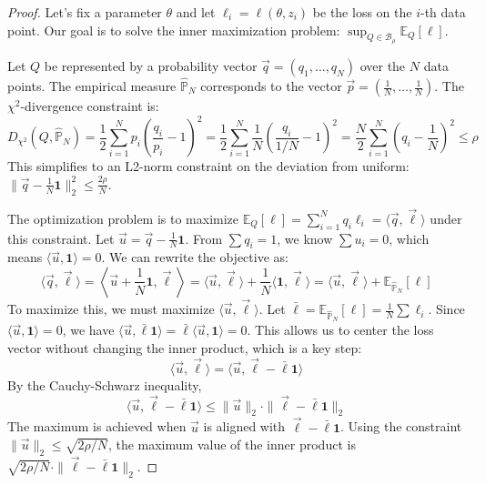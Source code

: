 \documentclass[12pt]{report}
\begin{document}
\begin{proof}
Let's fix a parameter $\theta$ and let $\ell_i = \ell(\theta, z_i)$ be the loss on the $i$-th data point. Our goal is to solve the inner maximization problem: $\sup_{Q \in \mathcal{B}_\rho} \mathbb{E}_Q[\ell]$.

Let $Q$ be represented by a probability vector $\vec{q} = (q_1, \dots, q_N)$ over the $N$ data points. The empirical measure $\hat{\mathbb{P}}_N$ corresponds to the vector $\vec{p} = (\frac{1}{N}, \dots, \frac{1}{N})$. The $\chi^2$-divergence constraint is:
\[
D_{\chi^2}(Q, \hat{\mathbb{P}}_N) = \frac{1}{2} \sum_{i=1}^N p_i \left(\frac{q_i}{p_i} - 1\right)^2 = \frac{1}{2} \sum_{i=1}^N \frac{1}{N} \left(\frac{q_i}{1/N} - 1\right)^2 = \frac{N}{2} \sum_{i=1}^N \left(q_i - \frac{1}{N}\right)^2 \le \rho
\]
This simplifies to an L2-norm constraint on the deviation from uniform: $\|\vec{q} - \frac{1}{N}\mathbf{1}\|_2^2 \le \frac{2\rho}{N}$.

The optimization problem is to maximize $\mathbb{E}_Q[\ell] = \sum_{i=1}^N q_i \ell_i = \langle \vec{q}, \vec{\ell} \rangle$ under this constraint. Let $\vec{u} = \vec{q} - \frac{1}{N}\mathbf{1}$. From $\sum q_i = 1$, we know $\sum u_i = 0$, which means $\langle \vec{u}, \mathbf{1} \rangle = 0$. We can rewrite the objective as:
\[
\langle \vec{q}, \vec{\ell} \rangle = \left\langle \vec{u} + \frac{1}{N}\mathbf{1}, \vec{\ell} \right\rangle = \langle \vec{u}, \vec{\ell} \rangle + \frac{1}{N} \langle \mathbf{1}, \vec{\ell} \rangle = \langle \vec{u}, \vec{\ell} \rangle + \mathbb{E}_{\hat{\mathbb{P}}_N}[\ell]
\]
To maximize this, we must maximize $\langle \vec{u}, \vec{\ell} \rangle$. Let $\bar{\ell} = \mathbb{E}_{\hat{\mathbb{P}}_N}[\ell] = \frac{1}{N}\sum \ell_i$. Since $\langle \vec{u}, \mathbf{1} \rangle = 0$, we have $\langle \vec{u}, \bar{\ell}\mathbf{1} \rangle = \bar{\ell} \langle \vec{u}, \mathbf{1} \rangle = 0$. This allows us to center the loss vector without changing the inner product, which is a key step:
\[
\langle \vec{u}, \vec{\ell} \rangle = \langle \vec{u}, \vec{\ell} - \bar{\ell}\mathbf{1} \rangle
\]
By the Cauchy-Schwarz inequality,
\[
\langle \vec{u}, \vec{\ell} - \bar{\ell}\mathbf{1} \rangle \le \|\vec{u}\|_2 \cdot \|\vec{\ell} - \bar{\ell}\mathbf{1}\|_2
\]
The maximum is achieved when $\vec{u}$ is aligned with $\vec{\ell} - \bar{\ell}\mathbf{1}$. Using the constraint $\|\vec{u}\|_2 \le \sqrt{2\rho/N}$, the maximum value of the inner product is $\sqrt{2\rho/N} \cdot \|\vec{\ell} - \bar{\ell}\mathbf{1}\|_2$.


\end{proof}
\end{document}
